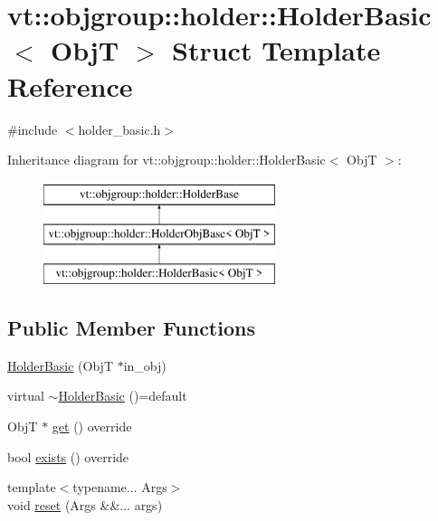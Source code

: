 \hypertarget{structvt_1_1objgroup_1_1holder_1_1_holder_basic}{}\section{vt\+:\+:objgroup\+:\+:holder\+:\+:Holder\+Basic$<$ ObjT $>$ Struct Template Reference}
\label{structvt_1_1objgroup_1_1holder_1_1_holder_basic}


{\ttfamily \#include $<$holder\+\_\+basic.\+h$>$}

Inheritance diagram for vt\+:\+:objgroup\+:\+:holder\+:\+:Holder\+Basic$<$ ObjT $>$\+:\begin{figure}[H]
\begin{center}
\leavevmode
\includegraphics[height=3.000000cm]{structvt_1_1objgroup_1_1holder_1_1_holder_basic}
\end{center}
\end{figure}
\subsection*{Public Member Functions}
\begin{DoxyCompactItemize}
\item 
\hyperlink{structvt_1_1objgroup_1_1holder_1_1_holder_basic_a0e74a9b5eb928c8d9cdaf81dd0994d7b}{Holder\+Basic} (ObjT $\ast$in\+\_\+obj)
\item 
virtual \hyperlink{structvt_1_1objgroup_1_1holder_1_1_holder_basic_a7446aae8de5ccb8e9cceee2143ca29ea}{$\sim$\+Holder\+Basic} ()=default
\item 
ObjT $\ast$ \hyperlink{structvt_1_1objgroup_1_1holder_1_1_holder_basic_af1d605b64e5f9d77d4b291c402133f3f}{get} () override
\item 
bool \hyperlink{structvt_1_1objgroup_1_1holder_1_1_holder_basic_ab52459a275afea84f6650d206fe5b3dc}{exists} () override
\item 
{\footnotesize template$<$typename... Args$>$ }\\void \hyperlink{structvt_1_1objgroup_1_1holder_1_1_holder_basic_ae0e03732280c6c1cf44f9ff8f24426c2}{reset} (Args \&\&... args)
\end{DoxyCompactItemize}



